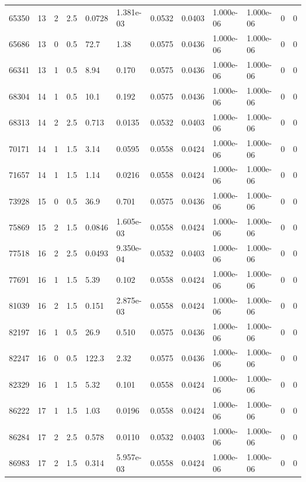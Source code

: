 \documentclass[preview]{standalone}
\begin{document}
{{{\begin{tabular}{L{1.2cm}C{1.2cm} C{0.3cm}C{0.5cm} C{1.4cm}C{1.4cm} C{1.4cm}C{1.4cm} C{1.6cm}C{1.6cm} C{1.6cm}C{1.6cm}}
  65350  &    13  & 2     & 2.5 &  0.0728  & 1.381e-03  &  0.0532&   0.0403& 1.000e-06 & 1.000e-06   &  0 & 0  \\ 
  65686  &    13  & 0     & 0.5 &  72.7  & 1.38  &  0.0575&   0.0436& 1.000e-06 & 1.000e-06   &  0 & 0  \\ 
  66341  &    13  & 1     & 0.5 &  8.94  & 0.170  &  0.0575&   0.0436& 1.000e-06 & 1.000e-06   &  0 & 0  \\ 
  68304  &    14  & 1     & 0.5 &  10.1  & 0.192  &  0.0575&   0.0436& 1.000e-06 & 1.000e-06   &  0 & 0  \\ 
  68313  &    14  & 2     & 2.5 &  0.713  & 0.0135  &  0.0532&   0.0403& 1.000e-06 & 1.000e-06   &  0 & 0  \\ 
  70171  &    14  & 1     & 1.5 &  3.14  & 0.0595  &  0.0558&   0.0424& 1.000e-06 & 1.000e-06   &  0 & 0  \\ 
  71657  &    14  & 1     & 1.5 &  1.14  & 0.0216  &  0.0558&   0.0424& 1.000e-06 & 1.000e-06   &  0 & 0  \\ 
  73928  &    15  & 0     & 0.5 &  36.9  & 0.701  &  0.0575&   0.0436& 1.000e-06 & 1.000e-06   &  0 & 0  \\ 
  75869  &    15  & 2     & 1.5 &  0.0846  & 1.605e-03  &  0.0558&   0.0424& 1.000e-06 & 1.000e-06   &  0 & 0  \\ 
  77518  &    16  & 2     & 2.5 &  0.0493  & 9.350e-04  &  0.0532&   0.0403& 1.000e-06 & 1.000e-06   &  0 & 0  \\ 
  77691  &    16  & 1     & 1.5 &  5.39  & 0.102  &  0.0558&   0.0424& 1.000e-06 & 1.000e-06   &  0 & 0  \\ 
  81039  &    16  & 2     & 1.5 &  0.151  & 2.875e-03  &  0.0558&   0.0424& 1.000e-06 & 1.000e-06   &  0 & 0  \\ 
  82197  &    16  & 1     & 0.5 &  26.9  & 0.510  &  0.0575&   0.0436& 1.000e-06 & 1.000e-06   &  0 & 0  \\ 
  82247  &    16  & 0     & 0.5 &  122.3  & 2.32  &  0.0575&   0.0436& 1.000e-06 & 1.000e-06   &  0 & 0  \\ 
  82329  &    16  & 1     & 1.5 &  5.32  & 0.101  &  0.0558&   0.0424& 1.000e-06 & 1.000e-06   &  0 & 0  \\ 
  86222  &    17  & 1     & 1.5 &  1.03  & 0.0196  &  0.0558&   0.0424& 1.000e-06 & 1.000e-06   &  0 & 0  \\ 
  86284  &    17  & 2     & 2.5 &  0.578  & 0.0110  &  0.0532&   0.0403& 1.000e-06 & 1.000e-06   &  0 & 0  \\ 
  86983  &    17  & 2     & 1.5 &  0.314  & 5.957e-03  &  0.0558&   0.0424& 1.000e-06 & 1.000e-06   &  0 & 0  \\ 

\end{tabular}}}}
\end{document}
